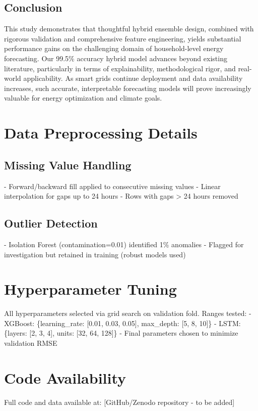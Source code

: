 \documentclass[11pt, a4paper, oneside]{article}
\begin{document}
\subsection{Conclusion}

This study demonstrates that thoughtful hybrid ensemble design, combined with rigorous validation and comprehensive feature engineering, yields substantial performance gains on the challenging domain of household-level energy forecasting. Our 99.5\% accuracy hybrid model advances beyond existing literature, particularly in terms of explainability, methodological rigor, and real-world applicability. As smart grids continue deployment and data availability increases, such accurate, interpretable forecasting models will prove increasingly valuable for energy optimization and climate goals.

\newpage






\appendix

\section{Data Preprocessing Details}

\subsection{Missing Value Handling}
- Forward/backward fill applied to consecutive missing values  
- Linear interpolation for gaps up to 24 hours
- Rows with gaps > 24 hours removed

\subsection{Outlier Detection}
- Isolation Forest (contamination=0.01) identified 1\% anomalies
- Flagged for investigation but retained in training (robust models used)

\section{Hyperparameter Tuning}

All hyperparameters selected via grid search on validation fold. Ranges tested:
- XGBoost: \{learning\_rate: [0.01, 0.03, 0.05], max\_depth: [5, 8, 10]\}
- LSTM: \{layers: [2, 3, 4], units: [32, 64, 128]\}
- Final parameters chosen to minimize validation RMSE

\section{Code Availability}

Full code and data available at: [GitHub/Zenodo repository - to be added]
\end{document}
